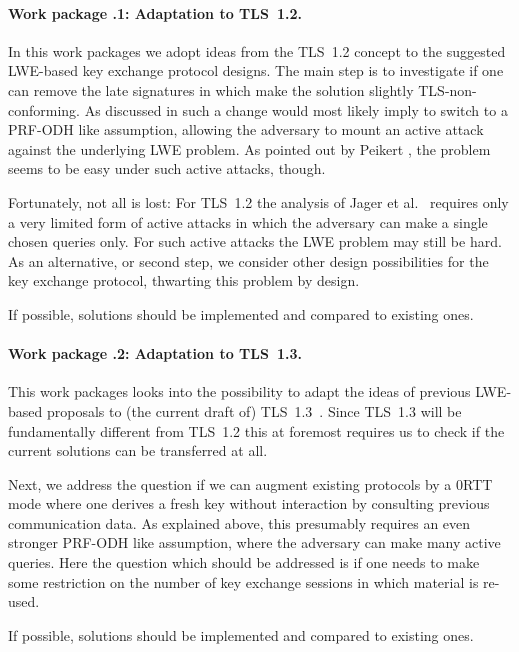 \label{mf:wp:zwei}

\paragraph{Work package \theworkpackage.1: Adaptation to TLS~1.2.}

In this work packages we adopt ideas from the TLS~1.2 concept \cite{TLS12} to the suggested LWE-based key exchange protocol designs. The main step is to investigate if one can remove the late signatures in \cite{BCNS15} which make the solution slightly TLS-non-conforming. As discussed in \cite{BCNS15} such a change would most likely imply to switch to a PRF-ODH like assumption, allowing the adversary to mount an active attack against the underlying LWE problem. As pointed out by Peikert \cite{P14}, the problem seems to be easy under such active attacks, though. 

Fortunately, not all is lost: For TLS~1.2 the analysis of Jager et al.~\cite{JKSS12} requires only a very limited form of active attacks in which the adversary can make a single chosen queries only. For such active attacks the LWE problem may still be hard. As an alternative, or second step, we consider other design possibilities for the key exchange protocol, thwarting this problem by design.

If possible, solutions should be implemented and compared to existing ones.

\paragraph{Work package \theworkpackage.2: Adaptation to TLS~1.3.}

This work packages looks into the possibility to adapt the ideas of previous LWE-based proposals to (the current draft of) TLS~1.3~\cite{TLS13}. Since TLS~1.3 will be fundamentally different from TLS~1.2 this at foremost requires us to check if the current solutions can be transferred at all. 

Next, we address the question if we can augment existing protocols by a 0RTT mode where one derives a fresh key without interaction by consulting previous communication data. As explained above, this presumably requires an even stronger PRF-ODH like assumption, where the adversary can make many active queries. Here the question which should be addressed is if one needs to make some restriction on the number of key exchange sessions in which material is re-used.

If possible, solutions should be implemented and compared to existing ones.


